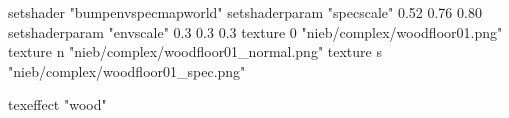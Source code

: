 setshader "bumpenvspecmapworld"
setshaderparam "specscale" 0.52 0.76 0.80
setshaderparam "envscale"  0.3 0.3 0.3
   texture 0 "nieb/complex/woodfloor01.png"
   texture n "nieb/complex/woodfloor01_normal.png"
   texture s "nieb/complex/woodfloor01_spec.png"

texeffect "wood"
